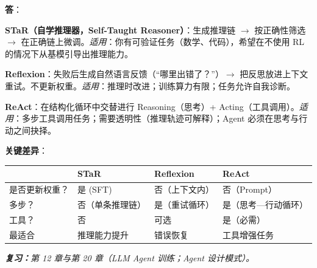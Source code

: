 \begin{questionbox}
\textbf{答}：

\textbf{STaR（自学推理器，Self-Taught Reasoner）}：生成推理链 $\to$ 按正确性筛选 $\to$ 在正确链上微调。\emph{适用}：你有可验证任务（数学、代码），希望在不使用 RL 的情况下从基模引导出推理能力。

\textbf{Reflexion}：失败后生成自然语言反馈（“哪里出错了？”）$\to$ 把反思放进上下文重试。不更新权重。\emph{适用}：推理时改进；训练算力有限；任务允许自我诊断。

\textbf{ReAct}：在结构化循环中交替进行 Reasoning（思考）+ Acting（工具调用）。\emph{适用}：多步工具调用任务；需要透明性（推理轨迹可解释）；Agent 必须在思考与行动之间抉择。

\textbf{关键差异}：

\begin{center}
\begin{tabular}{@{}l l l l@{}}
\toprule
 & \textbf{STaR} & \textbf{Reflexion} & \textbf{ReAct} \\
\midrule
是否更新权重？ & 是 (SFT) & 否（上下文内） & 否（Prompt） \\
多步？ & 否（单条推理链） & 是（重试循环） & 是（思考—行动循环） \\
工具？ & 否 & 可选 & 是（必需） \\
最适合 & 推理能力提升 & 错误恢复 & 工具增强任务 \\
\bottomrule
\end{tabular}
\end{center}

\emph{\textbf{复习：}第 12 章与第 20 章（LLM Agent 训练；Agent 设计模式）。}
\end{questionbox}

